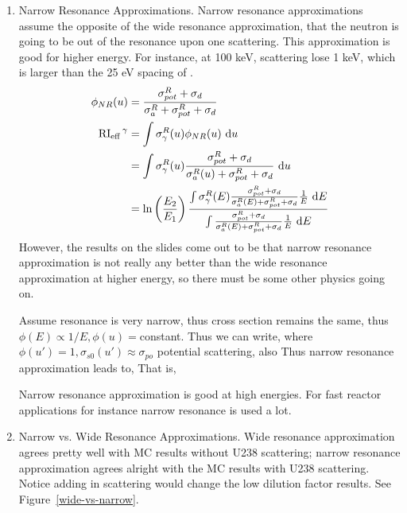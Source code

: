 \documentclass{school-22.211-notes}
\begin{document}
\begin{enumerate}
%

\item Narrow Resonance Approximations. Narrow resonance approximations assume the opposite of the wide resonance approximation, that the neutron is going to be out of the resonance upon one scattering. This approximation is good for higher energy. For instance, at 100 keV, scattering lose 1 keV, which is larger than the 25 eV spacing of . 
\begin{align}
\phi_{NR} (u) &= \frac{\sigma_{pot}^R + \sigma_d}{\sigma_{a}^R + \sigma_{pot}^R + \sigma_d } \\
\left. \mathrm{RI}_{\mathrm{eff}} \right.^{\gamma} &= \int \sigma_{\gamma}^R (u) \phi_{NR} (u) \mbox{ }\mathrm{d} u \\
&= \int \sigma_{\gamma}^R (u) \frac{\sigma_{pot}^R + \sigma_d}{\sigma_a^R(u) + \sigma_{pot}^R + \sigma_d} \mbox{ }\mathrm{d} u \\
&= \ln\left( \frac{E_2}{E_1} \right) \frac{ \int \sigma_{\gamma}^R (E) \frac{\sigma_{pot}^R + \sigma_d}{\sigma_{a}^R(E) + \sigma_{pot}^R + \sigma_d} \frac{1}{E} \mbox{ }\mathrm{d} E}{ \int \frac{\sigma_{pot}^R + \sigma_d}{\sigma_{a}^R(E) + \sigma_{pot}^R + \sigma_d} \frac{1}{E} \mbox{ }\mathrm{d} E}
\end{align}
However, the results on the slides come out to be that narrow resonance approximation is not really any better than the wide resonance approximation at higher energy, so there must be some other physics going on. 


Assume resonance is very narrow, thus cross section remains the same, thus $\phi(E) \propto 1/E, \phi(u) = $constant. Thus we can write, 
where $\phi(u') = 1, \sigma_{s0} (u')\approx \sigma_{po}$ potential scattering, also 
Thus narrow resonance approximation leads to, 
That is, 

Narrow resonance approximation is good at high energies. For fast reactor applications for instance narrow resonance is used a lot. 








\item Narrow vs. Wide Resonance Approximations\label{narrow-wide-compr}. 
Wide resonance approximation agrees pretty well with MC results without U238 scattering; narrow resonance approximation agrees alright with the MC results with U238 scattering. Notice adding in scattering would change the low dilution factor results. See Figure~\ref{wide-vs-narrow}.


\end{enumerate}
\end{document}
